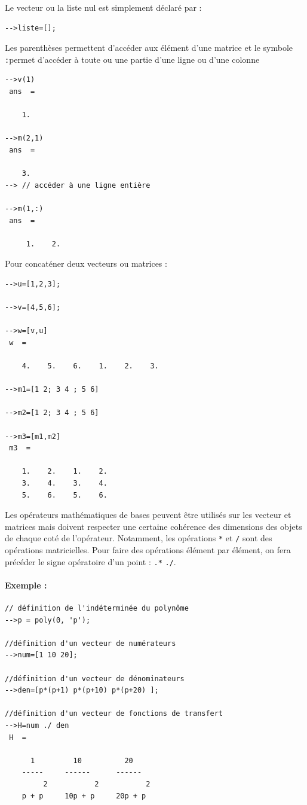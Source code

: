 Le vecteur ou la liste nul est simplement déclaré par :
\begin{code}
\begin{verbatim}
-->liste=[];
\end{verbatim}
\end{code}


Les parenthèses permettent d'accéder aux élément d'une matrice et le 
symbole \og\verb?:?\fg permet d'accéder à toute ou une partie d'une ligne ou d'une colonne
\begin{code}
\begin{verbatim}
-->v(1)
 ans  =
 
    1.  

-->m(2,1)
 ans  =
 
    3.  
--> // accéder à une ligne entière
 
-->m(1,:)
 ans  =
   
     1.    2. 
\end{verbatim}
\end{code}

\newpage
Pour concaténer deux vecteurs ou matrices :
\begin{code}
\begin{verbatim}
-->u=[1,2,3];
 
-->v=[4,5,6];
 
-->w=[v,u]
 w  =
 
    4.    5.    6.    1.    2.    3.

-->m1=[1 2; 3 4 ; 5 6]
 
-->m2=[1 2; 3 4 ; 5 6]
 
-->m3=[m1,m2]
 m3  =
 
    1.    2.    1.    2.  
    3.    4.    3.    4.  
    5.    6.    5.    6. 
\end{verbatim}
\end{code}

Les opérateurs mathématiques de bases peuvent être utilisés 
sur les vecteur et matrices mais doivent respecter une certaine cohérence des dimensions 
des objets de chaque coté de l'opérateur. Notamment, les opérations \verb?*? et \verb?/? sont
des opérations matricielles. Pour faire des opérations élément par élément,
on fera précéder le signe opératoire d'un point : \verb?.*? \verb?./?.

\paragraph{Exemple :}
\begin{code}
\begin{verbatim}
// définition de l'indéterminée du polynôme
-->p = poly(0, 'p');

//définition d'un vecteur de numérateurs
-->num=[1 10 20];

//définition d'un vecteur de dénominateurs
-->den=[p*(p+1) p*(p+10) p*(p+20) ];

//définition d'un vecteur de fonctions de transfert
-->H=num ./ den
 H  =
 
      1         10          20      
    -----     ------      ------    
         2           2           2  
    p + p     10p + p     20p + p   
\end{verbatim}
\end{code}

